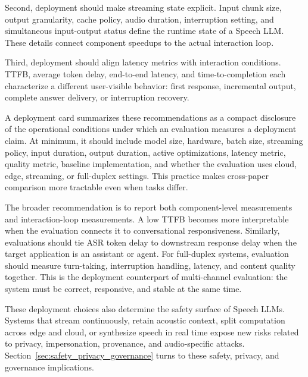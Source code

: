 Second, deployment should make streaming state explicit. Input chunk size, output granularity, cache policy, audio duration, interruption setting, and simultaneous input-output status define the runtime state of a Speech LLM. These details connect component speedups to the actual interaction loop.

Third, deployment should align latency metrics with interaction conditions. TTFB, average token delay, end-to-end latency, and time-to-completion each characterize a different user-visible behavior: first response, incremental output, complete answer delivery, or interruption recovery.

A deployment card summarizes these recommendations as a compact disclosure of the operational conditions under which an evaluation measures a deployment claim. At minimum, it should include model size, hardware, batch size, streaming policy, input duration, output duration, active optimizations, latency metric, quality metric, baseline implementation, and whether the evaluation uses cloud, edge, streaming, or full-duplex settings. This practice makes cross-paper comparison more tractable even when tasks differ.

The broader recommendation is to report both component-level measurements and interaction-loop measurements. A low TTFB becomes more interpretable when the evaluation connects it to conversational responsiveness. Similarly, evaluations should tie ASR token delay to downstream response delay when the target application is an assistant or agent. For full-duplex systems, evaluation should measure turn-taking, interruption handling, latency, and content quality together. This is the deployment counterpart of multi-channel evaluation: the system must be correct, responsive, and stable at the same time.

These deployment choices also determine the safety surface of Speech LLMs. Systems that stream continuously, retain acoustic context, split computation across edge and cloud, or synthesize speech in real time expose new risks related to privacy, impersonation, provenance, and audio-specific attacks. Section~\ref{sec:safety_privacy_governance} turns to these safety, privacy, and governance implications.
